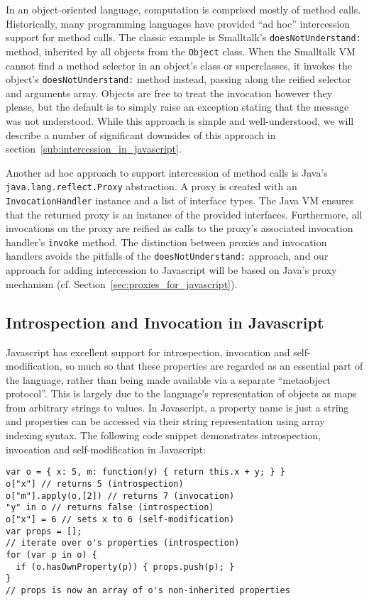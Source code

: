 \documentclass[10pt,legalpaper]{article}
\begin{document}
In an object-oriented language, computation is comprised mostly of method calls. Historically, many programming languages have provided ``ad hoc'' intercession support for method calls. The classic example is Smalltalk's \texttt{doesNotUnderstand:} method, inherited by all objects from the \texttt{Object} class. When the Smalltalk VM cannot find a method selector in an object's class or superclasses, it invokes the object's \texttt{doesNotUnderstand:} method instead, passing along the reified selector and arguments array. Objects are free to treat the invocation however they please, but the default is to simply raise an exception stating that the message was not understood. While this approach is simple and well-understood, we will describe a number of significant downsides of this approach in section~\ref{sub:intercession_in_javascript}.

Another ad hoc approach to support intercession of method calls is Java's \texttt{java.lang.reflect.Proxy} abstraction. A proxy is created with an \texttt{InvocationHandler} instance and a list of interface types. The Java VM ensures that the returned proxy is an instance of the provided interfaces. Furthermore, all invocations on the proxy are reified as calls to the proxy's associated invocation handler's \texttt{invoke} method. The distinction between proxies and invocation handlers avoids the pitfalls of the \texttt{doesNotUnderstand:} approach, and our approach for adding intercession to Javascript will be based on Java's proxy mechanism (cf. Section~\ref{sec:proxies_for_javascript}).

\subsection{Introspection and Invocation in Javascript}

Javascript has excellent support for introspection, invocation and self-modification, so much so that these properties are regarded as an essential part of the language, rather than being made available via a separate ``metaobject protocol''. This is largely due to the language's representation of objects as maps from arbitrary strings to values. In Javascript, a property name is just a string and properties can be accessed via their string representation using array indexing syntax. The following code snippet demonstrates introspection, invocation and self-modification in Javascript:

\begin{lstlisting}
var o = { x: 5, m: function(y) { return this.x + y; } }
o["x"] // returns 5 (introspection)
o["m"].apply(o,[2]) // returns 7 (invocation)
"y" in o // returns false (introspection)
o["x"] = 6 // sets x to 6 (self-modification)
var props = [];
// iterate over o's properties (introspection)
for (var p in o) {
  if (o.hasOwnProperty(p)) { props.push(p); }
}
// props is now an array of o's non-inherited properties
\end{lstlisting}
\end{document}
